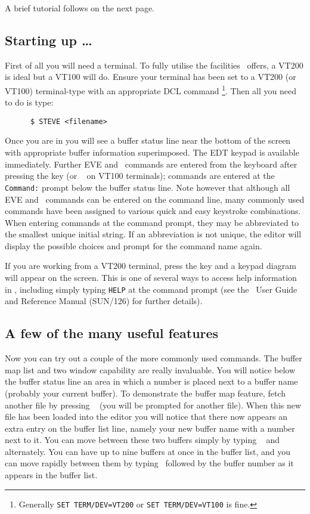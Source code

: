 A brief tutorial follows on the next page.

\newpage

\subsection*{Starting up \ldots}
First of all you will need a terminal. To fully utilise the facilities \STEve\
offers, a VT200 is ideal but a VT100 will do. Ensure your terminal has been set
to a VT200 (or VT100) terminal-type with an appropriate DCL command \footnote{
Generally {\tt SET TERM/DEV=VT200} or {\tt SET TERM/DEV=VT100} is fine.}. Then
all you need to do is type:

\begin{verbatim}
      $ STEVE <filename>
\end{verbatim}

Once you are in you will see a buffer status line near the bottom of the screen
with appropriate buffer information superimposed. The EDT keypad is available
immediately. Further EVE and \STEve\ commands are entered from the keyboard
after pressing the \keyname{Do} key (or \gold\ \keyname{KP7} on VT100
terminals); commands are entered at the {\tt Command:} prompt below the buffer
status line. Note however that although all EVE and \STEve\ commands can be
entered on the command line, many commonly used commands have been assigned to
various quick and easy keystroke combinations. When entering  commands at the
command prompt, they may be abbreviated to the smallest unique initial string. 
If an abbreviation is not unique, the editor will display the possible choices
and prompt for the command name again. 

If you are working from a VT200 terminal, press the  key and a
keypad diagram will appear on the screen. This is one of several ways to access
help information in \STEve, including simply typing {\tt HELP} at the command
prompt (see the \STEve\ User Guide and Reference Manual (SUN/126) for
further details).

\subsection*{A few of the many useful features}
Now you can try out a couple of the more commonly used commands. The buffer map
list and two window capability are really invaluable. You will notice below the
buffer status line an area in which a number is placed next to a buffer name
(probably your current buffer). To demonstrate the buffer map feature, fetch
another file by pressing \gold\ \keyname{G} (you will be prompted for
another file). When this new file has been loaded into the editor you will
notice that there now appears an extra entry on the buffer list line, namely
your new buffer name with a number next to it. You can move between these two
buffers simply by typing \gold\ \keyname{1} and \gold\ \keyname{2} alternately.
You can have up to nine buffers at once in the buffer list, and you can move
rapidly between them by typing \gold\ followed by the buffer number as it
appears in the buffer list. 

